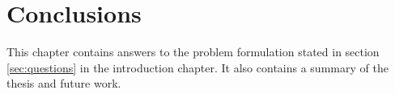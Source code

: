 \documentclass{cslthse-msc}
\begin{document}








\chapter{Conclusions}
This chapter contains answers to the problem formulation stated in section \ref{sec:questions} in the introduction chapter. It also contains a summary of the thesis and future work. 
\end{document}

